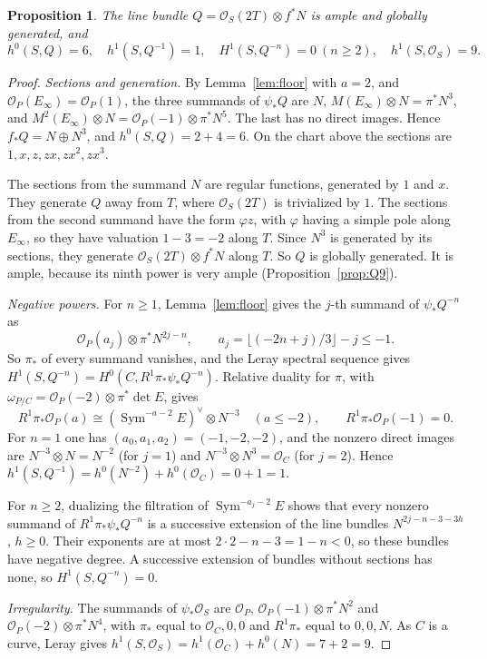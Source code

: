 \documentclass[11pt,a4paper]{article}
\theoremstyle{plain}
\newtheorem{proposition}[theorem]{Proposition}
\theoremstyle{remark}
\newcommand{\OO}{\mathcal O}
\newcommand{\Sym}{\operatorname{Sym}}
\begin{document}
\begin{proposition}\label{prop:Q}
The line bundle $Q=\OO_S(2T)\otimes f^*N$ is ample and globally generated, and
\[
 h^0(S,Q)=6,\quad h^1(S,Q^{-1})=1,\quad H^1(S,Q^{-n})=0\ (n\ge2),\quad h^1(S,\OO_S)=9 .
\]
\end{proposition}
\begin{proof}
\emph{Sections and generation.} By Lemma~\ref{lem:floor} with $a=2$, and $\OO_P(E_\infty)=\OO_P(1)$, the three summands of
$\psi_*Q$ are $N$, $M(E_\infty)\otimes N=\pi^*N^3$, and $M^2(E_\infty)\otimes N=\OO_P(-1)\otimes\pi^*N^5$. The last has no
direct images. Hence $f_*Q=N\oplus N^3$, and $h^0(S,Q)=2+4=6$. On the chart above the sections are
$1,x,z,zx,zx^2,zx^3$.

The sections from the summand $N$ are regular functions, generated by $1$ and $x$. They generate $Q$ away from $T$,
where $\OO_S(2T)$ is trivialized by $1$. The sections from the second summand have the form $\varphi z$, with $\varphi$
having a simple pole along $E_\infty$, so they have valuation $1-3=-2$ along $T$. Since $N^3$ is generated by its
sections, they generate $\OO_S(2T)\otimes f^*N$ along $T$. So $Q$ is globally generated. It is ample, because its ninth
power is very ample (Proposition~\ref{prop:Q9}).

\emph{Negative powers.} For $n\ge1$, Lemma~\ref{lem:floor} gives the $j$-th summand of $\psi_*Q^{-n}$ as
\[
 \OO_P(a_j)\otimes\pi^*N^{2j-n},\qquad a_j=\lfloor(-2n+j)/3\rfloor-j\le-1 .
\]
So $\pi_*$ of every summand vanishes, and the Leray spectral sequence gives $H^1(S,Q^{-n})=H^0(C,R^1\pi_*\psi_*Q^{-n})$.
Relative duality for $\pi$, with $\omega_{P/C}=\OO_P(-2)\otimes\pi^*\det E$, gives
\[
 R^1\pi_*\OO_P(a)\cong(\Sym^{-a-2}E)^\vee\otimes N^{-3}\quad(a\le-2),\qquad R^1\pi_*\OO_P(-1)=0 .
\]
For $n=1$ one has $(a_0,a_1,a_2)=(-1,-2,-2)$, and the nonzero direct images are $N^{-3}\otimes N=N^{-2}$ (for $j=1$) and
$N^{-3}\otimes N^3=\OO_C$ (for $j=2$). Hence $h^1(S,Q^{-1})=h^0(N^{-2})+h^0(\OO_C)=0+1=1$.

For $n\ge2$, dualizing the filtration of $\Sym^{-a_j-2}E$ shows that every nonzero summand of $R^1\pi_*\psi_*Q^{-n}$ is
a successive extension of the line bundles $N^{2j-n-3-3h}$, $h\ge0$. Their exponents are at most $2\cdot2-n-3=1-n<0$,
so these bundles have negative degree. A successive extension of bundles without sections has none, so
$H^1(S,Q^{-n})=0$.

\emph{Irregularity.} The summands of $\psi_*\OO_S$ are $\OO_P$, $\OO_P(-1)\otimes\pi^*N^2$ and $\OO_P(-2)\otimes\pi^*N^4$,
with $\pi_*$ equal to $\OO_C,0,0$ and $R^1\pi_*$ equal to $0,0,N$. As $C$ is a curve, Leray gives
$h^1(S,\OO_S)=h^1(\OO_C)+h^0(N)=7+2=9$.
\end{proof}
\end{document}
